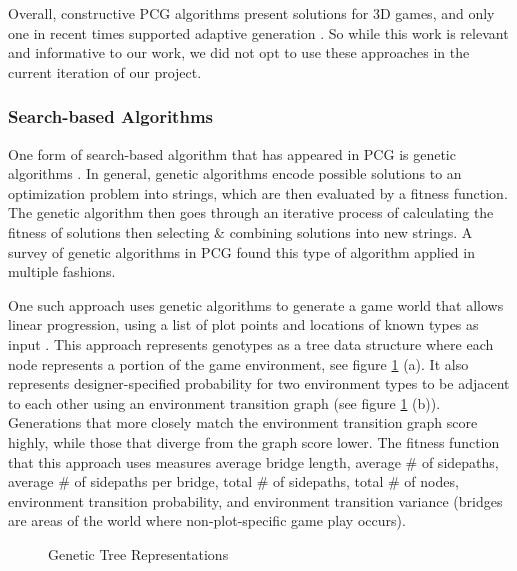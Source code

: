 \documentclass[11pt, oneside]{article}
\begin{document}
\begin{normalsize}
Overall, constructive PCG algorithms present solutions for 3D games, and only one in recent times supported adaptive generation \cite{viana2019survey}. So while this work is relevant and informative to our work, we did not opt to use these approaches in the current iteration of our project.

\subsubsection{Search-based Algorithms}

One form of search-based algorithm that has appeared in PCG is genetic algorithms \cite{togelius2011search}. In general, genetic algorithms encode possible solutions to an optimization problem into strings, which are then evaluated by a fitness function. The genetic algorithm then goes through an iterative process of calculating the fitness of solutions then selecting \& combining solutions into new strings. A survey of genetic algorithms in PCG found this type of algorithm applied in multiple fashions.

One such approach uses genetic algorithms to generate a game world that allows linear progression, using a list of plot points and locations of known types as input \cite{hartsook2011toward}. This approach represents genotypes as a tree data structure where each node represents a portion of the game environment, see figure \ref{fig:gen} (a). It also represents designer-specified probability for two environment types to be adjacent to each other using an environment transition graph (see figure \ref{fig:gen} (b)). Generations that more closely match the environment transition graph score highly, while those that diverge from the graph score lower. The fitness function that this approach uses measures average bridge length, average \# of sidepaths, average \# of sidepaths per bridge, total \# of sidepaths, total \# of nodes, environment transition probability, and environment transition variance (bridges are areas of the world where non-plot-specific game play occurs).

\begin{figure}[H]%
    \centering
    \qquad
    \caption{Genetic Tree Representations}%
    \label{fig:gen}%
\end{figure}


\end{normalsize}
\end{document}

